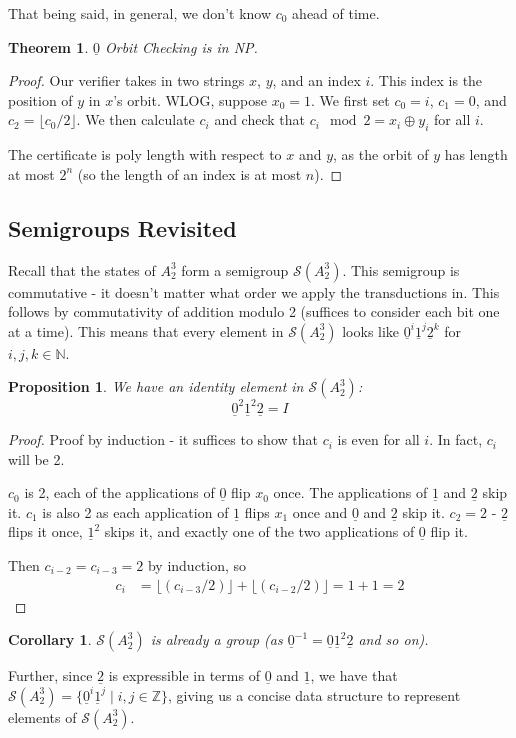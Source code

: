 \documentclass[11pt]{book}
\theoremstyle{pleasant}
\newtheorem{proposition}{Proposition}
\newtheorem{theorem}{Theorem}
\newtheorem{corollary}{Corollary}
\newcommand{\0}{\underline{0}}
\newcommand{\1}{\underline{1}}
\newcommand{\2}{\underline{2}}
\newcommand{\N}{\mathbb{N}}
\newcommand{\Z}{\mathbb{Z}}
\renewcommand{\S}{\mathcal{S}}
\begin{document}
That being said, in general, we don't know $c_0$ ahead of time.

\begin{theorem}
$\0$ Orbit Checking is in NP.
\end{theorem}
\begin{proof}
Our verifier takes in two strings $x$, $y$, and an index $i$. This index is the position of $y$ in $x$'s orbit. WLOG, suppose $x_0 = 1$. We first set $c_0 = i$, $c_1 = 0$, and $c_2 = \lfloor c_0 / 2 \rfloor$. We then calculate $c_i$ and check that $c_i \mod 2 = x_i \oplus y_i$ for all $i$.

The certificate is poly length with respect to $x$ and $y$, as the orbit of $y$ has length at most $2^n$ (so the length of an index is at most $n$).
\end{proof}



\subsection*{Semigroups Revisited}
Recall that the states of $A^3_2$ form a semigroup $\S(A^3_2)$. This semigroup is commutative - it doesn't matter what order we apply the transductions in. This follows by commutativity of addition modulo 2 (suffices to consider each bit one at a time). This means that every element in $\S(A^3_2)$ looks like $\0^i \1^j\2^k$ for $i, j, k \in \N$.

\begin{proposition}
We have an identity element in $\S(A^3_2)$: $$\0^2\1^2\2 = I$$
\end{proposition}
\begin{proof}
Proof by induction - it suffices to show that $c_i$ is even for all $i$. In fact, $c_i$ will be 2.

$c_0$ is 2, each of the applications of $\0$ flip $x_0$ once. The applications of $\1$ and $\2$ skip it. $c_1$ is also 2 as each application of $\1$ flips $x_1$ once and $\0$ and $\2$ skip it. $c_2 = 2$ - $\2$ flips it once, $\1^2$ skips it, and exactly one of the two applications of $\0$ flip it.

Then $c_{i-2} = c_{i-3} = 2$ by induction, so
\begin{align*}
c_i &= \lfloor (c_{i-3} / 2) \rfloor + \lfloor (c_{i-2} / 2) \rfloor = 1 + 1 = 2
\end{align*}
\end{proof}
\begin{corollary}
$\S(A^3_2)$ is already a group (as $\0^{-1} = \0\1^2\2$ and so on).
\end{corollary}
Further, since $\2$ is expressible in terms of $\0$ and $\1$, we have that $\S(A^3_2) = \{ \0^i \1^j \mid i, j \in \Z \}$, giving us a concise data structure to represent elements of $\S(A^3_2)$.
\end{document}
